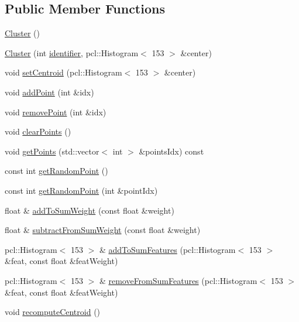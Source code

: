 \subsection*{Public Member Functions}
\begin{DoxyCompactItemize}
\item 
\hyperlink{class_cluster_aee7feb1d599d4c8fda6c3ee83e86ba81}{Cluster} ()
\item 
\hyperlink{class_cluster_a7ec216455347ce05a9e0b410378a01f9}{Cluster} (int \hyperlink{class_cluster_a5b3de44acabe712cdcc405fa40f8812a}{identifier}, pcl\+::\+Histogram$<$ 153 $>$ \&center)
\item 
void \hyperlink{class_cluster_a9af018a96861327b211e6fe5c7290f52}{set\+Centroid} (pcl\+::\+Histogram$<$ 153 $>$ \&center)
\item 
void \hyperlink{class_cluster_af01610223d1a98628ba974609918db91}{add\+Point} (int \&idx)
\item 
void \hyperlink{class_cluster_aa0e0757d491b0b201500c64978abdaf8}{remove\+Point} (int \&idx)
\item 
void \hyperlink{class_cluster_a0c4f4cc4e9249ac54ccb995b7d027f52}{clear\+Points} ()
\item 
void \hyperlink{class_cluster_a77511825a9d51c343a20565a7e71a23c}{get\+Points} (std\+::vector$<$ int $>$ \&points\+Idx) const
\item 
const int \hyperlink{class_cluster_add3a7f58320774fdfcb3772b992115a0}{get\+Random\+Point} ()
\item 
const int \hyperlink{class_cluster_aab876ab329ebaa1c4baaac5bf5dadcbf}{get\+Random\+Point} (int \&point\+Idx)
\item 
float \& \hyperlink{class_cluster_a7b871b24968ca5c63bfd32cda9ff6c75}{add\+To\+Sum\+Weight} (const float \&weight)
\item 
float \& \hyperlink{class_cluster_a93b4f6092b558747d0882bf0af959da8}{subtract\+From\+Sum\+Weight} (const float \&weight)
\item 
pcl\+::\+Histogram$<$ 153 $>$ \& \hyperlink{class_cluster_ac0922c4c1a1d54fbd9971a77b785698d}{add\+To\+Sum\+Features} (pcl\+::\+Histogram$<$ 153 $>$ \&feat, const float \&feat\+Weight)
\item 
pcl\+::\+Histogram$<$ 153 $>$ \& \hyperlink{class_cluster_a8cf196c9c3f77aeeafb7b793967e17ed}{remove\+From\+Sum\+Features} (pcl\+::\+Histogram$<$ 153 $>$ \&feat, const float \&feat\+Weight)
\item 
void \hyperlink{class_cluster_a3ed40ce6adf7cc47b9e5721baed4fb51}{recompute\+Centroid} ()
\item 

\end{DoxyCompactItemize}

